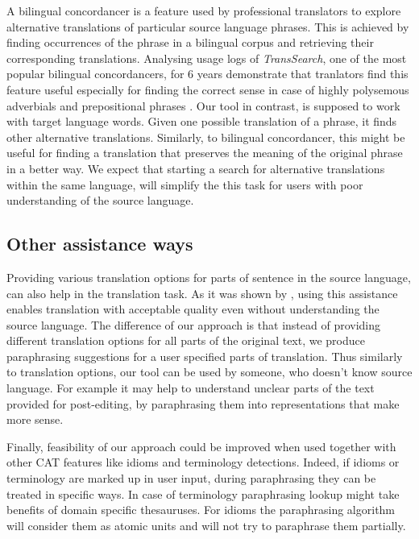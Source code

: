 A bilingual concordancer is a feature used by professional translators to explore alternative translations of particular source language phrases. This is achieved by finding occurrences of the phrase in a bilingual corpus and retrieving their corresponding translations. Analysing usage logs of \emph{TransSearch}, one of the most popular bilingual concordancers, for 6 years demonstrate that tranlators find this feature useful especially for finding the correct sense in case of highly polysemous adverbials and prepositional phrases \citep{Macklovitch2008}. Our tool in contrast, is supposed to work with target language words. Given one possible translation of a phrase, it finds other alternative translations. Similarly, to bilingual concordancer, this might be useful for finding a translation that preserves the meaning of the original phrase in a better way. We expect that starting a search for alternative translations within the same language, will simplify the this task for users with poor understanding of the source language.

\subsection{Other assistance ways}

Providing various translation options for parts of sentence in the source language, can also help in the translation task. As it was shown by \cite{Koehn2010}, using this assistance enables translation with acceptable quality even without understanding the source language. The difference of our approach is that instead of providing different translation options for all parts of the original text, we produce paraphrasing suggestions for a user specified parts of translation. Thus similarly to translation options, our tool can be used by someone, who doesn't know source language. For example it may help to understand unclear parts of the text provided for post-editing, by paraphrasing them into representations that make more sense.

Finally, feasibility of our approach could be improved when used together with other CAT features like idioms and terminology detections. Indeed, if idioms or terminology are marked up in user input, during paraphrasing they can be treated in specific ways. In case of terminology paraphrasing lookup might take benefits of domain specific thesauruses. For idioms the paraphrasing algorithm will consider them as atomic units and will not try to paraphrase them partially. 

